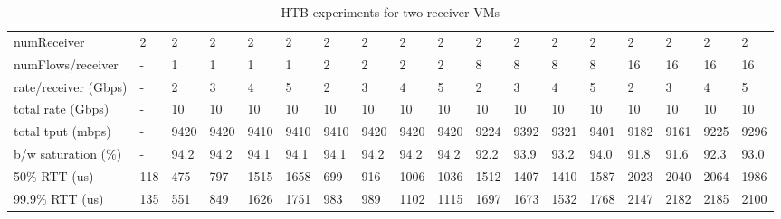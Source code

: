 \begin{table*}[!tb]
\centering
\tiny

{\setlength{\tabcolsep}{1pt}
\begin{tabular}{|l|l|llll|llll|llll|llll|}
\hline
numReceiver          & 2   & 2    & 2    & 2    & 2    & 2    & 2    & 2    & 2    & 2     & 2     & 2     & 2     & 2     & 2     & 2     & 2     \\
numFlows/receiver    & -   & 1    & 1    & 1    & 1    & 2    & 2    & 2    & 2    & 8     & 8     & 8     & 8     & 16    & 16    & 16    & 16    \\
rate/receiver (Gbps) & -   & 2    & 3    & 4    & 5    & 2    & 3    & 4    & 5    & 2     & 3     & 4     & 5     & 2     & 3     & 4     & 5     \\
total rate (Gbps)    & -   & 10   & 10   & 10   & 10   & 10   & 10   & 10   & 10   & 10    & 10    & 10    & 10    & 10    & 10    & 10    & 10    \\
\hline
total tput (mbps)    & -   & 9420 & 9420 & 9410 & 9410 & 9410 & 9420 & 9420 & 9420 & 9224  & 9392  & 9321  & 9401  & 9182  & 9161  & 9225  & 9296  \\
b/w saturation (\%)  & -   & 94.2 & 94.2 & 94.1 & 94.1 & 94.1 & 94.2 & 94.2 & 94.2 & 92.2  & 93.9  & 93.2  & 94.0  & 91.8  & 91.6  & 92.3  & 93.0 \\ \hline
50\% RTT (us)        & 118 & 475  & 797  & 1515 & 1658 & 699  & 916  & 1006 & 1036 & 1512  & 1407  & 1410  & 1587  & 2023  & 2040  & 2064  & 1986  \\
99.9\% RTT (us)      & 135 & 551  & 849  & 1626 & 1751 & 983  & 989  & 1102 & 1115 & 1697  & 1673  & 1532  & 1768  & 2147  & 2182  & 2185  & 2100 \\
\hline
\end{tabular}}
\caption{HTB experiments for two receiver VMs}
\label{tbl:htb-2rec} 
\end{table*}
